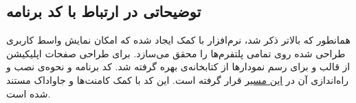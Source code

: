 \subsection{توضیحاتی در ارتباط با کد برنامه}
همانطور که بالاتر ذکر شد، نرم‌افزار با کمک  ایجاد شده که امکان نمایش واسط کاربری طراحی شده روی تمامی پلتفرم‌ها را محقق می‌سازد. برای طراحی صفحات اپلیکیشن از قالب  و برای رسم نمودارها از کتابخانه‌ی  بهره گرفته شد.
کد برنامه و نحوه‌ی نصب و راه‌اندازی آن در 
\href{https://github.com/Sharif-University-ESRLab/project-team-2/tree/main/Code/app}{این مسیر}
قرار گرفته است. این کد با کمک کامنت‌ها و جاواداک مستند شده است.




